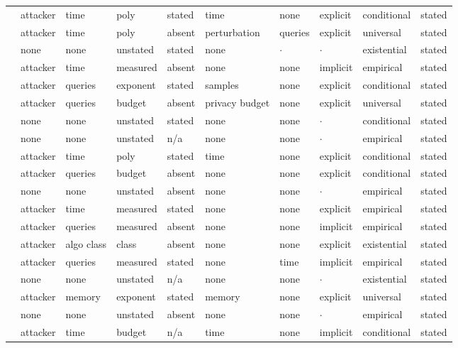 \begin{landscape}
\begin{longtable}{rlllllllll}
\cite{CKMMNST24} & attacker & time & poly & stated & time & none & explicit & conditional & stated \\
\cite{DN03} & attacker & time & poly & absent & perturbation & queries & explicit & universal & stated \\
\cite{KMNS25} & none & none & unstated & stated & none & $\cdot$ & $\cdot$ & existential & stated \\
\cite{BDJV22} & attacker & time & measured & absent & none & none & implicit & empirical & stated \\
\cite{HU14} & attacker & queries & exponent & stated & samples & none & explicit & conditional & stated \\
\cite{ML24} & attacker & queries & budget & absent & privacy budget & none & explicit & universal & stated \\
\cite{BCH22} & none & none & unstated & stated & none & none & $\cdot$ & conditional & stated \\
\cite{WLBZ25} & none & none & unstated & n/a & none & none & $\cdot$ & empirical & stated \\
\cite{XSD24} & attacker & time & poly & stated & time & none & explicit & conditional & stated \\
\cite{CCGJY19} & attacker & queries & budget & absent & none & none & explicit & conditional & stated \\
\cite{SSEP24} & none & none & unstated & absent & none & none & $\cdot$ & empirical & stated \\
\cite{DKLP22} & attacker & time & measured & stated & none & none & explicit & empirical & stated \\
\cite{CJM20} & attacker & queries & measured & absent & none & none & implicit & empirical & stated \\
\cite{JCBKP20} & attacker & algo class & class & absent & none & none & explicit & existential & stated \\
\cite{CCHRSS24} & attacker & queries & measured & stated & none & time & implicit & empirical & stated \\
\cite{TJSP22} & none & none & unstated & n/a & none & none & $\cdot$ & existential & stated \\
\cite{DQW22} & attacker & memory & exponent & stated & memory & none & explicit & universal & stated \\
\cite{KCC23} & none & none & unstated & absent & none & none & $\cdot$ & empirical & stated \\
\cite{ZFWCSXZ26} & attacker & time & budget & n/a & time & none & implicit & conditional & stated \\

\end{longtable}
\end{landscape}

